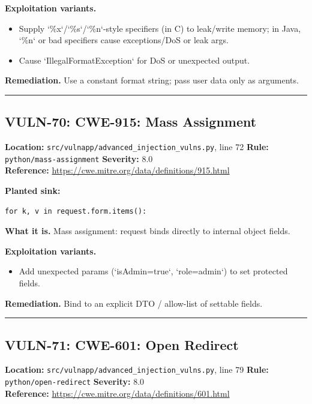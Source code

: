 \documentclass[11pt,a4paper]{article}
\begin{document}
\noindent\textbf{Exploitation variants.}
\begin{itemize}[leftmargin=1.4em,itemsep=1pt,topsep=2pt]
\item Supply `\%x`/`\%s`/`\%n`-style specifiers (in C) to leak/write memory; in Java, `\%n` or bad specifiers cause exceptions/DoS or leak args.
\item Cause `IllegalFormatException` for DoS or unexpected output.
\end{itemize}
\noindent\textbf{Remediation.} Use a constant format string; pass user data only as arguments.

\vspace{4pt}\hrule\vspace{6pt}
\subsection{VULN-70: CWE-915: Mass Assignment}
\noindent\textbf{Location:} \texttt{src/vulnapp/advanced\_injection\_vulns.py}, line 72 \quad \textbf{Rule:} \texttt{python/mass-assignment} \quad \textbf{Severity:} 8.0
\\ \textbf{Reference:} \url{https://cwe.mitre.org/data/definitions/915.html}

\noindent\textbf{Planted sink:}
\begin{lstlisting}
for k, v in request.form.items():
\end{lstlisting}
\noindent\textbf{What it is.} Mass assignment: request binds directly to internal object fields.

\noindent\textbf{Exploitation variants.}
\begin{itemize}[leftmargin=1.4em,itemsep=1pt,topsep=2pt]
\item Add unexpected params (`isAdmin=true`, `role=admin`) to set protected fields.
\end{itemize}
\noindent\textbf{Remediation.} Bind to an explicit DTO / allow-list of settable fields.

\vspace{4pt}\hrule\vspace{6pt}
\subsection{VULN-71: CWE-601: Open Redirect}
\noindent\textbf{Location:} \texttt{src/vulnapp/advanced\_injection\_vulns.py}, line 79 \quad \textbf{Rule:} \texttt{python/open-redirect} \quad \textbf{Severity:} 8.0
\\ \textbf{Reference:} \url{https://cwe.mitre.org/data/definitions/601.html}
\end{document}
